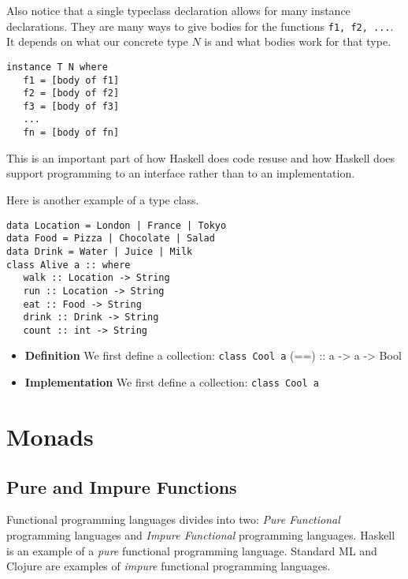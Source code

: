 Also notice that a single typeclass declaration allows for many instance declarations. 
They are many ways to give bodies for the functions \lstinline{f1, f2, ...}. 
It depends on what our concrete type $N$ is and what bodies work for that type. 

\begin{lstlisting}
instance T N where
   f1 = [body of f1]
   f2 = [body of f2]
   f3 = [body of f3]
   ...
   fn = [body of fn]
\end{lstlisting}

This is an important part of how Haskell does code resuse and how Haskell 
does support programming to an interface rather than to an implementation. 




Here is another example of a type class. 
\begin{lstlisting}
data Location = London | France | Tokyo
data Food = Pizza | Chocolate | Salad
data Drink = Water | Juice | Milk
class Alive a :: where
   walk :: Location -> String
   run :: Location -> String
   eat :: Food -> String
   drink :: Drink -> String
   count :: int -> String
\end{lstlisting}



\begin{itemize}	
\renewcommand{\labelitemi}{$\Box$}
\item \textbf{Definition} We first define a collection:
\lstinline{class Cool a}
(==)                  :: a -> a -> Bool
\item \textbf{Implementation} We first define a collection:
\lstinline{class Cool a}

\end{itemize}




\chapter{Monads}



\section{Pure and Impure Functions}

Functional programming languages divides into two: \textit{Pure Functional} programming languages 
and \textit{Impure Functional} programming languages. Haskell is an example of a \textit{pure} functional 
programming language. Standard ML and Clojure are examples of \textit{impure} functional programming languages.


